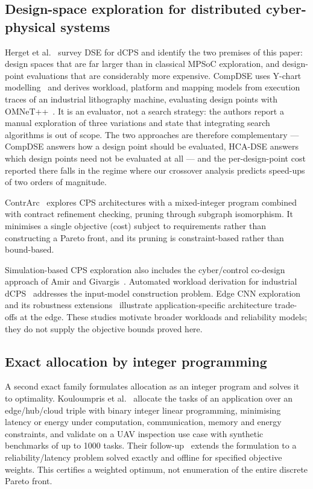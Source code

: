 \documentclass[preprint,11pt,3p]{elsarticle}
\theoremstyle{plain}
\theoremstyle{definition}
\begin{document}
\subsection{Design-space exploration for distributed cyber-physical systems}
Herget et al.~\cite{herget2022dse} survey DSE for dCPS and identify the two premises of
this paper: design spaces that are far larger than in classical MPSoC exploration, and
design-point evaluations that are considerably more expensive. CompDSE
\cite{saadatmand2025compdse} uses Y-chart modelling~\cite{kienhuis2002ychart}
and derives workload, platform and mapping models from execution traces of an industrial
lithography machine, evaluating design points with OMNeT++~\cite{varga2008omnet}. It is
an evaluator, not a search strategy: the authors report a manual exploration of three
variations and state that integrating search algorithms is out of scope. The two
approaches are therefore complementary --- CompDSE answers how a design point should be
evaluated, HCA-DSE answers which design points need not be evaluated at all --- and the
per-design-point cost reported there falls in the regime where our crossover analysis
predicts speed-ups of two orders of magnitude.

ContrArc~\cite{xiao2024contrarc} explores CPS architectures with a mixed-integer program
combined with contract refinement checking, pruning through subgraph isomorphism. It
minimises a single objective (cost) subject to requirements rather than constructing a
Pareto front, and its pruning is constraint-based rather than bound-based.

Simulation-based CPS exploration also includes the cyber/control co-design approach of
Amir and Givargis~\cite{amir2020pareto}. Automated workload derivation for industrial
dCPS~\cite{saadatmand2024workload} addresses the input-model construction problem.
Edge CNN exploration~\cite{guo2023} and its robustness extensions~\cite{guo2025}
illustrate application-specific architecture trade-offs at the edge. These studies motivate
broader workloads and reliability models; they do not supply the objective bounds proved here.

\subsection{Exact allocation by integer programming}
\label{sec:related:milp}
A second exact family formulates allocation as an integer program and solves it to
optimality. Kouloumpris et al.~\cite{kouloumpris2024optimization} allocate the tasks of
an application over an edge/hub/cloud triple with binary integer linear programming,
minimising latency or energy under computation, communication, memory and energy
constraints, and validate on a UAV inspection use case with synthetic benchmarks of up to
1000 tasks. Their follow-up~\cite{kouloumpris2026reliability} extends the formulation to
a reliability/latency problem solved exactly and offline for specified objective weights. This certifies a weighted optimum, not enumeration of the entire discrete Pareto front.
\end{document}
